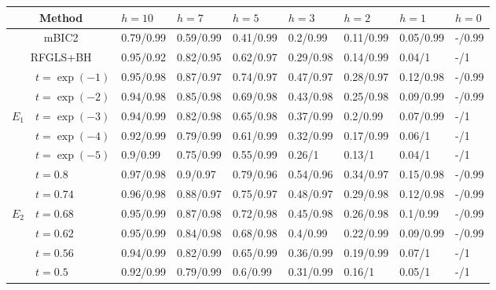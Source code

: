 \begin{table}[b]
\centering
\begin{scriptsize}
    \begin{tabular}{c|l|lllllll}
    \hline
    \multicolumn{2}{c|}{Method}          & $h = 10$    & $h = 7$     & $h = 5$     & $h = 3$     & $h = 2$     & $h = 1$     & $h = 0$     \\ \hline
    \multicolumn{2}{c|}{mBIC2}           & 0.79/0.99 & 0.59/0.99 & 0.41/0.99 & 0.2/0.99  & 0.11/0.99 & 0.05/0.99 & -/0.99 \\
    \multicolumn{2}{c|}{RFGLS+BH}        & 0.95/0.92 & 0.82/0.95 & 0.62/0.97 & 0.29/0.98 & 0.14/0.99 & 0.04/1    & -/1       \\ \hline
    ~        & $t = \exp(-1)$ & 0.95/0.98 & 0.87/0.97 & 0.74/0.97 & 0.47/0.97 & 0.28/0.97 & 0.12/0.98 & -/0.99 \\
    ~        & $t = \exp(-2)$ & 0.94/0.98 & 0.85/0.98 & 0.69/0.98 & 0.43/0.98 & 0.25/0.98 & 0.09/0.99 & -/0.99 \\
    $E_1$    & $t = \exp(-3)$ & 0.94/0.99 & 0.82/0.98 & 0.65/0.98 & 0.37/0.99 & 0.2/0.99  & 0.07/0.99 & -/1       \\
    ~        & $t = \exp(-4)$ & 0.92/0.99 & 0.79/0.99 & 0.61/0.99 & 0.32/0.99 & 0.17/0.99 & 0.06/1    & -/1       \\
    ~        & $t = \exp(-5)$ & 0.9/0.99  & 0.75/0.99 & 0.55/0.99 & 0.26/1    & 0.13/1    & 0.04/1    & -/1       \\ \hline
    ~        & $t = 0.8$    & 0.97/0.98 & 0.9/0.97  & 0.79/0.96 & 0.54/0.96 & 0.34/0.97 & 0.15/0.98 & -/0.99 \\
    ~        & $t = 0.74$   & 0.96/0.98 & 0.88/0.97 & 0.75/0.97 & 0.48/0.97 & 0.29/0.98 & 0.12/0.98 & -/0.99 \\
    $E_2$    & $t = 0.68$   & 0.95/0.99 & 0.87/0.98 & 0.72/0.98 & 0.45/0.98 & 0.26/0.98 & 0.1/0.99  & -/0.99 \\
    ~        & $t = 0.62$   & 0.95/0.99 & 0.84/0.98 & 0.68/0.98 & 0.4/0.99  & 0.22/0.99 & 0.09/0.99 & -/0.99    \\
    ~        & $t = 0.56$   & 0.94/0.99 & 0.82/0.99 & 0.65/0.99 & 0.36/0.99 & 0.19/0.99 & 0.07/1    & -/1       \\
    ~        & $t = 0.5$    & 0.92/0.99 & 0.79/0.99 & 0.6/0.99  & 0.31/0.99 & 0.16/1    & 0.05/1    & -/1       \\ \hline
    \end{tabular}
    

\end{scriptsize}
\end{table}
